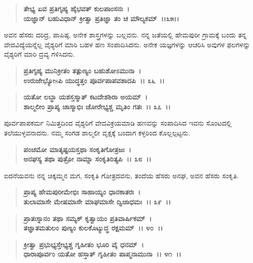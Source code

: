 \begin{verse}
\textbf{ತೇಭ್ಯ ಏವ ಪ್ರತಿಗೃಹ್ಯ ಹೈಭವತ್ ಕುಲಪಾಂಸನಃ~।}\\\textbf{ಯಜ್ಞಾನ್ ಬಹುವಿಧಾನ್ ಕ್ರೀತ್ವಾ ಪ್ರತಿಜ್ಞಾ ತಂ ಚ ಮೌಲ್ಯಕಮ್~।।೩೫।।}
\end{verse}

ಅವನ ಹೆಸರು ದರಿದ್ರ, ಪಾಪಿಷ್ಠ, ಅನೇಕ ಶಾಸ್ತ್ರಗಳನ್ನು ಬಲ್ಲವನು. ನನ್ನ ಜತೆಯಲ್ಲಿ ಹೇಮಪುರೀ ಗ್ರಾಮಕ್ಕೆ ಬಂದು ತನ್ನ ವೇದವಿದ್ಯೆಯನ್ನೆಲ್ಲ ವೈಶ್ಯರಿಗೆ ಮಾರಿ ಬಹಳ ಹಣ ಸಂಪಾದಿಸಿದನು. ಅನೇಕ ಯಜ್ಞಗಳನ್ನು ಆಚರಿಸಿ ಅವುಗಳ ಫಲಗಳನ್ನು ವೈಶ್ಯರಿಗೆ ಮಾರಿ ದ್ರವ್ಯ ಗಳಿಸಿದನು.

\begin{verse}
\textbf{ಪ್ರತಿಗೃಹ್ಯ ಮುನಿಕ್ರೀತಂ ತತ್ಪುಣ್ಯಂ ಬಹುಶೋಽಮುನಾ~।}\\\textbf{ಉರುಜೇಭ್ಯೋsಪಿ ಯುದ್ಧತ್ತಂ ಪೂರ್ವಪಾಪವಶಾದಪಿ~।। ೩೬~।।}
\end{verse}

\begin{verse}
\textbf{ಯತೋ ಲಬ್ಧಾ ಯಶಸ್ತಸ್ಮಾತ್ ಕಟದೇಶಶಿರಾ ಅಯಮ್~।}\\\textbf{ಶಾಲ್ಮಲೀಂ ಪ್ರಾಪ್ಯ ಚಾಸ್ಮಾಭಿಃ ಚೋರೇಭ್ಯಶ್ಚ ಮೃತಿಂ ಗತಃ~।। ೩೭~।।}
\end{verse}

ಪೂರ್ವಪಾಪಕರ್ಮ ನಿಮಿತ್ತದಿಂದ ವೈಶ್ಯರಿಗೆ ವೇದವಿಕ್ರಯಮಾಡಿ ಹಣವನ್ನು ಸಂಪಾದಿಸಿದ ಇವನು ಸೊಂಟದಲ್ಲಿ ತಲೆಯುಳ್ಳವನಾದನು. ನಮ್ಮ ಸಂಗಡ ಶಾಲ್ಮಲೀ ವೃಕ್ಷಕ್ಕೆ ಬಂದಾಗ ಕಳ್ಳರಿಂದ ಕೊಲ್ಲಲ್ಪಟ್ಟನು.

\begin{verse}
\textbf{ಪಂಚಮೋ ಮಾತೃಷ್ಟಯಸ್ತಥಾ ಸಂಕೃತಿಗೋತ್ರಜಃ~।}\\\textbf{ಅನಘಸ್ಯ ತಥಾ ಪುತ್ರೋ ನಾಮ್ನಾ ಸಂಕೃತಿರಿತ್ಯಪಿ~।। ೩೮~।।}
\end{verse}

ಐದನೆಯವನು ನನ್ನ ಚಿಕ್ಕಮ್ಮನ ಮಗ, ಸಂಕೃತಿ ಗೋತ್ರದವನು, ತಂದೆಯ ಹೆಸರು ಅನಘ, ಅವನ ಹೆಸರು ಸಂಕೃತಿ.

\begin{verse}
\textbf{ಪ್ರಾಪ್ಯ ಹೇಮಪುರೀಮೇಭಿಃ ಸಾಹಾಯ್ಯಂ ಧಾನಕಾತರಃ~।}\\\textbf{ತುಲಾಮಾಸೇ ಮೇಷಮಾಸೇ ಮಾಘಮಾಸೇ ದ್ವಿಜಾಧಮಃ~।। ೩೯~।। }
\end{verse}

\begin{verse}
\textbf{ಪ್ರಾತಃಸ್ನಾನಂ ತಥಾ ಸಮ್ಯಕ್ ಕೃತ್ವಾಯಂ ಪ್ರತಿವಾರ್ಷಿಕಮ್~।}\\\textbf{ತಜ್ಞಾತಮತುಲಂ ಪುಣ್ಯಂ ಕುಲಕೊಟ್ಯುದ್ಧ ರಕ್ಷಮಮ್~।। ೪೦~।। }
\end{verse}

\begin{verse}
\textbf{ಕ್ರೀತ್ವಾ ಪ್ರಭುಭ್ಯಸ್ತೇಭ್ಯಶ್ಚ ಗೃಹೀತಂ ಭೂರಿ ವೈ ಧನಮ್~।}\\\textbf{ಧಾರಾಪೂರ್ವಂ ಯತೋ ಹಸ್ತಾತ್ ಗೃಹೀತಂ ಪಾಪ್ಮನಾಮುನಾ~।। ೪೧~।।}
\end{verse}

